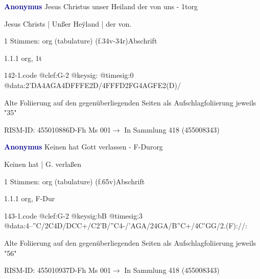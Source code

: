 \documentclass[twocolumn]{book}
\begin{document}
\par \vspace{7pt} \textcolor{darkblue}{\textbf{Anonymus  }}\hfillplus{\textbf{[142]}}\newline Jesus Christus unser Heiland der von uns - 1t\newline org
\par \begin{itshape}[f.35r, at left:] Jesus Christs | Unßer Heÿland | der von.\end{itshape} 
\par \textcolor{darkblue}{}  1 Stimmen: org (tabulature)  (f.34v-34r)\newline Abschrift
\par 1.1.1  org, 1t  
\begin{filecontents*}{142-1.code}
@clef:G-2
@keysig:
@timesig:0
@data:2'DA4AGA4DFFFE2D/4FFFD2FG4AGFE2(D)/
\end{filecontents*}
\newline
%
\par Alte Foliierung auf den gegenüberliegenden Seiten als Aufschlagfoliierung jeweils "35"
\par RISM-ID: 455010886\newline D-Fh  Ms 001\newline $\rightarrow$ In Sammlung 418 (455008343)
      
\par \vspace{7pt} \textcolor{darkblue}{\textbf{Anonymus  }}\hfillplus{\textbf{[143]}}\newline Keinen hat Gott verlassen - F-Dur\newline org
\par \begin{itshape}[f.65v, at left:] Keinen hat | G. verlaßen\end{itshape} 
\par \textcolor{darkblue}{}  1 Stimmen: org (tabulature)  (f.65v)\newline Abschrift
\par 1.1.1  org, F-Dur  
\begin{filecontents*}{143-1.code}
@clef:G-2
@keysig:bB
@timesig:3
@data:4--''C/2C4D/DCC+/C2'B/''C4-/'AGA/24GA/B''C+/4C'GG/2.(F)://:
\end{filecontents*}
\newline
%
\par Alte Foliierung auf den gegenüberliegenden Seiten als Aufschlagfoliierung jeweils "56"
\par RISM-ID: 455010937\newline D-Fh  Ms 001\newline $\rightarrow$ In Sammlung 418 (455008343)
      
\end{document}
